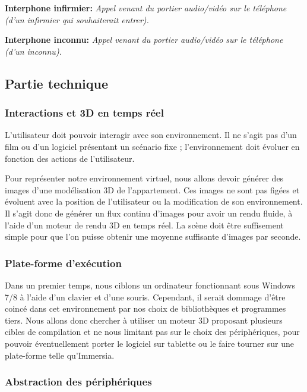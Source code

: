 \textbf{Interphone infirmier: } \textit{Appel venant du portier audio/vidéo sur le téléphone (d'un infirmier qui souhaiterait entrer). }

\textbf{Interphone inconnu: } \textit{Appel venant du portier audio/vidéo sur le téléphone (d'un inconnu). }

\subsection{Partie technique}
\subsubsection{Interactions et 3D en temps réel}
L'utilisateur doit pouvoir interagir avec son environnement. Il ne s'agit pas d'un film ou d'un logiciel présentant un scénario fixe ; l'environnement doit évoluer en fonction des actions de l'utilisateur.

Pour représenter notre environnement virtuel, nous allons devoir générer des images d'une modélisation 3D de l'appartement. Ces images ne sont pas figées et évoluent avec la position de l'utilisateur ou la modification de son environnement. Il s'agit donc de générer un flux continu d'images pour avoir un rendu fluide, à l'aide d'un moteur de rendu 3D en temps réel. La scène doit être suffisement simple pour que l'on puisse obtenir une moyenne suffisante d'images par seconde.

\subsubsection{Plate-forme d'exécution}

Dans un premier temps, nous ciblons un ordinateur fonctionnant sous Windows 7/8 à l'aide d'un clavier et d'une souris. Cependant, il serait dommage d'être coincé dans cet environnement par nos choix de bibliothèques et programmes tiers. Nous allons donc chercher à utiliser un moteur 3D proposant plusieurs cibles de compilation et ne nous limitant pas sur le choix des périphériques, pour pouvoir éventuellement porter le logiciel sur tablette ou le faire tourner sur une plate-forme telle qu'Immersia.

\subsubsection{Abstraction des périphériques}

